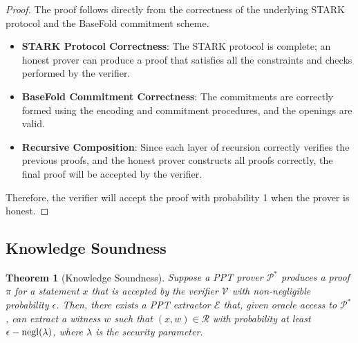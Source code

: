 \documentclass{article}
\theoremstyle{plain}
\newtheorem{theorem}{Theorem}[section]
\theoremstyle{definition}
\theoremstyle{remark}
\theoremstyle{problem}
\begin{document}
\begin{proof}
The proof follows directly from the correctness of the underlying STARK protocol and the BaseFold commitment scheme.

\begin{itemize}
    \item \textbf{STARK Protocol Correctness}: The STARK protocol is complete; an honest prover can produce a proof that satisfies all the constraints and checks performed by the verifier.

    \item \textbf{BaseFold Commitment Correctness}: The commitments are correctly formed using the encoding and commitment procedures, and the openings are valid.

    \item \textbf{Recursive Composition}: Since each layer of recursion correctly verifies the previous proofs, and the honest prover constructs all proofs correctly, the final proof will be accepted by the verifier.
\end{itemize}

Therefore, the verifier will accept the proof with probability 1 when the prover is honest.
\end{proof}

\subsection{Knowledge Soundness}

\begin{theorem}[Knowledge Soundness]
\label{thm:soundness}
Suppose a PPT prover \(\mathcal{P}^*\) produces a proof \(\pi\) for a statement \(x\) that is accepted by the verifier \(\mathcal{V}\) with non-negligible probability \(\epsilon\). Then, there exists a PPT extractor \(\mathcal{E}\) that, given oracle access to \(\mathcal{P}^*\), can extract a witness \(w\) such that \((x, w) \in \mathcal{R}\) with probability at least \(\epsilon - \textnormal{negl}(\lambda)\), where \(\lambda\) is the security parameter.
\end{theorem}
\end{document}
